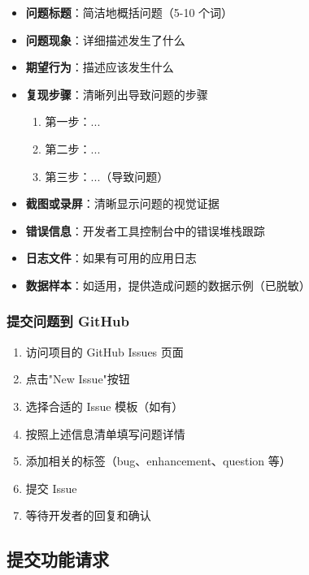 \documentclass[10pt,a4paper]{article}
\newcommand{\subtitle}[1]{%
  \vspace{3pt}
  \noindent{\textbf{#1}}
}
\begin{document}
\begin{itemize}
\begin{itemize}
\begin{itemize}
\begin{itemize}
\begin{enumerate}
\subtitle{问题描述}
\begin{itemize}
  \item \textbf{问题标题}：简洁地概括问题（5-10 个词）
  \item \textbf{问题现象}：详细描述发生了什么
  \item \textbf{期望行为}：描述应该发生什么
  \item \textbf{复现步骤}：清晰列出导致问题的步骤
    \begin{enumerate}
      \item 第一步：...
      \item 第二步：...
      \item 第三步：...（导致问题）
    \end{enumerate}
\end{itemize}

\subtitle{附加信息}
\begin{itemize}
  \item \textbf{截图或录屏}：清晰显示问题的视觉证据
  \item \textbf{错误信息}：开发者工具控制台中的错误堆栈跟踪
  \item \textbf{日志文件}：如果有可用的应用日志
  \item \textbf{数据样本}：如适用，提供造成问题的数据示例（已脱敏）
\end{itemize}

\subsubsection{提交问题到 GitHub}
\begin{enumerate}
  \item 访问项目的 GitHub Issues 页面
  \item 点击"New Issue"按钮
  \item 选择合适的 Issue 模板（如有）
  \item 按照上述信息清单填写问题详情
  \item 添加相关的标签（bug、enhancement、question 等）
  \item 提交 Issue
  \item 等待开发者的回复和确认
\end{enumerate}

\subsection{提交功能请求}


\end{enumerate}
\end{itemize}
\end{itemize}
\end{itemize}
\end{itemize}
\end{document}

